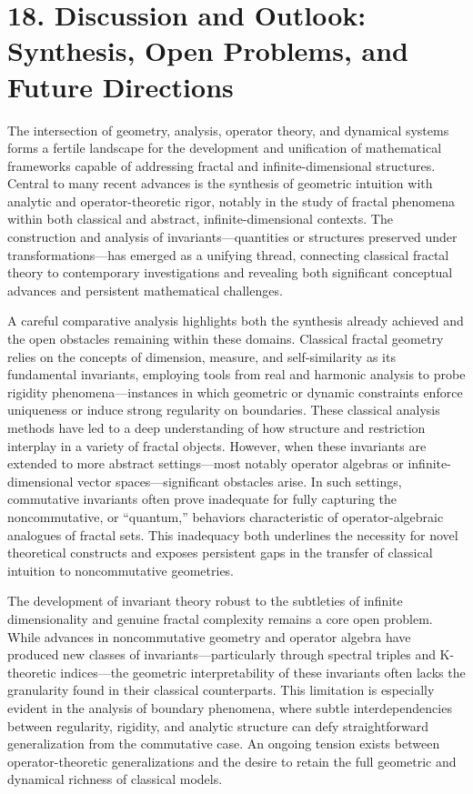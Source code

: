 \documentclass[11pt]{article}
\begin{document}
\section*{18. Discussion and Outlook: Synthesis, Open Problems, and Future Directions}

The intersection of geometry, analysis, operator theory, and dynamical systems forms a fertile landscape for the development and unification of mathematical frameworks capable of addressing fractal and infinite-dimensional structures. Central to many recent advances is the synthesis of geometric intuition with analytic and operator-theoretic rigor, notably in the study of fractal phenomena within both classical and abstract, infinite-dimensional contexts. The construction and analysis of invariants—quantities or structures preserved under transformations—has emerged as a unifying thread, connecting classical fractal theory to contemporary investigations and revealing both significant conceptual advances and persistent mathematical challenges.

A careful comparative analysis highlights both the synthesis already achieved and the open obstacles remaining within these domains. Classical fractal geometry relies on the concepts of dimension, measure, and self-similarity as its fundamental invariants, employing tools from real and harmonic analysis to probe rigidity phenomena—instances in which geometric or dynamic constraints enforce uniqueness or induce strong regularity on boundaries. These classical analysis methods have led to a deep understanding of how structure and restriction interplay in a variety of fractal objects. However, when these invariants are extended to more abstract settings—most notably operator algebras or infinite-dimensional vector spaces—significant obstacles arise. In such settings, commutative invariants often prove inadequate for fully capturing the noncommutative, or “quantum,” behaviors characteristic of operator-algebraic analogues of fractal sets. This inadequacy both underlines the necessity for novel theoretical constructs and exposes persistent gaps in the transfer of classical intuition to noncommutative geometries.

The development of invariant theory robust to the subtleties of infinite dimensionality and genuine fractal complexity remains a core open problem. While advances in noncommutative geometry and operator algebra have produced new classes of invariants—particularly through spectral triples and K-theoretic indices—the geometric interpretability of these invariants often lacks the granularity found in their classical counterparts. This limitation is especially evident in the analysis of boundary phenomena, where subtle interdependencies between regularity, rigidity, and analytic structure can defy straightforward generalization from the commutative case. An ongoing tension exists between operator-theoretic generalizations and the desire to retain the full geometric and dynamical richness of classical models.
\end{document}
